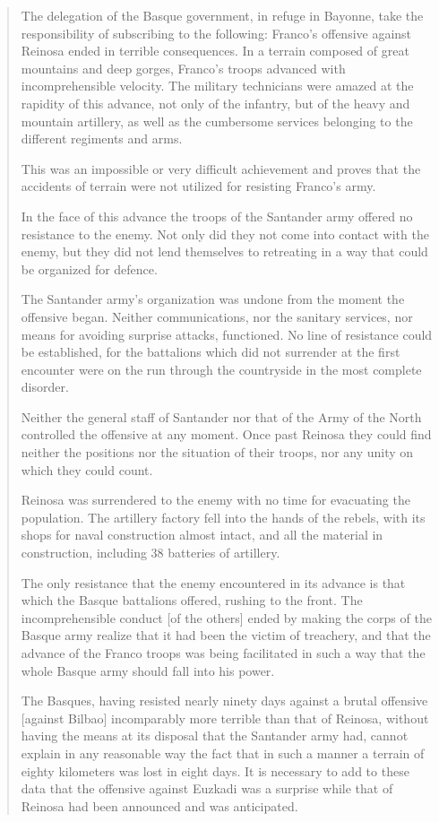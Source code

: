 \begin{quotation}
  The delegation of the Basque government, in refuge in Bayonne, take the responsibility of subscribing to the following: Franco’s offensive against Reinosa ended in terrible consequences. In a terrain composed of great mountains and deep gorges, Franco’s troops advanced with incomprehensible velocity. The military technicians were amazed at the rapidity of this advance, not only of the infantry, but of the heavy and mountain artillery, as well as the cumbersome services belonging to the different regiments and arms.
  
  This was an impossible or very difficult achievement and proves that the accidents of terrain were not utilized for resisting Franco’s army.
  
  In the face of this advance the troops of the Santander army offered no resistance to the enemy. Not only did they not come into contact with the enemy, but they did not lend themselves to retreating in a way that could be organized for defence.
  
  The Santander army’s organization was undone from the moment the offensive began. Neither communications, nor the sanitary services, nor means for avoiding surprise attacks, functioned. No line of resistance could be established, for the battalions which did not surrender at the first encounter were on the run through the countryside in the most complete disorder.
  
  Neither the general staff of Santander nor that of the Army of the North controlled the offensive at any moment. Once past Reinosa they could find neither the positions nor the situation of their troops, nor any unity on which they could count.
  
  Reinosa was surrendered to the enemy with no time for evacuating the population. The artillery factory fell into the hands of the rebels, with its shops for naval construction almost intact, and all the material in construction, including 38 batteries of artillery.
  
  The only resistance that the enemy encountered in its advance is that which the Basque battalions offered, rushing to the front. The incomprehensible conduct [of the others] ended by making the corps of the Basque army realize that it had been the victim of treachery, and that the advance of the Franco troops was being facilitated in such a way that the whole Basque army should fall into his power.
  
  The Basques, having resisted nearly ninety days against a brutal offensive [against Bilbao] incomparably more terrible than that of Reinosa, without having the means at its disposal that the Santander army had, cannot explain in any reasonable way the fact that in such a manner a terrain of eighty kilometers was lost in eight days. It is necessary to add to these data that the offensive against Euzkadi was a surprise while that of Reinosa had been announced and was anticipated.
  

\end{quotation}
